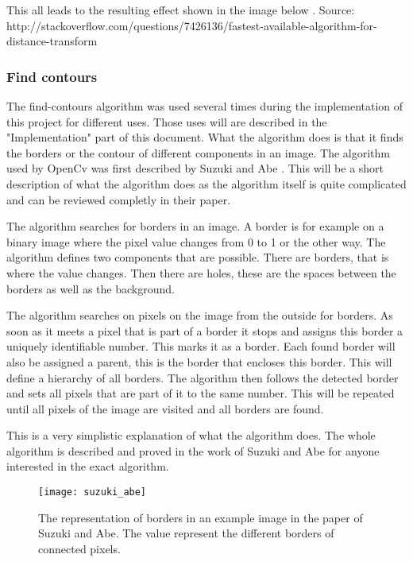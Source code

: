 This all leads to the resulting effect shown in the image below \citep[Section 3.3.3]{szeliski_2011}.
Source: http://stackoverflow.com/questions/7426136/fastest-available-algorithm-for-distance-transform

\subsubsection{Find contours}
The find-contours algorithm was used several times during the implementation of this project for different uses. Those uses will are described in the "Implementation" part of this document. What the algorithm does is that it finds the borders or the contour of different components in an image. The algorithm used by OpenCv was first described by Suzuki and Abe \cite{suzuki_abe_1985}. This will be a short description of what the algorithm does as the algorithm itself is quite complicated and can be reviewed completly in their paper.

The algorithm searches for borders in an image. A border is for example on a binary image where the pixel value changes from 0 to 1 or the other way. The algorithm defines two components that are possible. There are borders, that is where the value changes. Then there are holes, these are the spaces between the borders as well as the background.

The algorithm searches on pixels on the image from the outside for borders. As soon as it meets a pixel that is part of a border it stops and assigns this border a uniquely identifiable number. This marks it as a border. Each found border will also be assigned a parent, this is the border that encloses this border. This will define a hierarchy of all borders. The algorithm then follows the detected border and sets all pixels that are part of it to the same number. This will be repeated until all pixels of the image are visited and all borders are found.

This is a very simplistic explanation of what the algorithm does. The whole algorithm is described and proved in the work of Suzuki and Abe \cite{suzuki_abe_1985} for anyone interested in the exact algorithm.

\begin{figure}[h]
	\centering
	\texttt{[image: suzuki\_abe]}
	\caption{The representation of borders in an example image in the paper of Suzuki and Abe. The value represent the different borders of connected pixels.}
	\label{suzuki_abe}
\end{figure}

